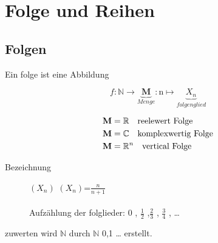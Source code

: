 
\chapter{Folge und Reihen}
\section{Folgen}
\begin{definition}[Folgen]
    Ein folge ist eine Abbildung

    \[ f: \mathbb{N} \rightarrow \underbrace{\mathbf{M}}_{Menge} : \mathrm{n} \mapsto \underbrace{X_n}_{folgenglied} \]

\end{definition}
\begin{remark}

    \begin{align}	\mathbf{M} &= \mathbb{R} \quad \text{reelewert Folge} \notag \\
    \mathbf{M}&= \mathbb{C} \quad	\text{komplexwertig Folge}   \notag \\
    \mathbf{M}&= \mathbb{R}^n \quad \text{vertical Folge} \notag
    \end{align}




\end{remark}
\begin{description}

    \item[Bezeichnung]

    \quad $(X_n)$ \space {} \space $ \left( X_n   \right)$=$ \frac{n}{n+1} $
    \\ \\ Aufzählung der folglieder: 0 , $\frac{1}{2}$ ,$\frac{2}{3}$ , $\frac{3}{4}$ , \dots

\end{description}
\begin{remark}
    zuwerten wird $\mathbb{N}$ durch $\mathbb{N}$ {0,1 \dots} erstellt.


\end{remark}
